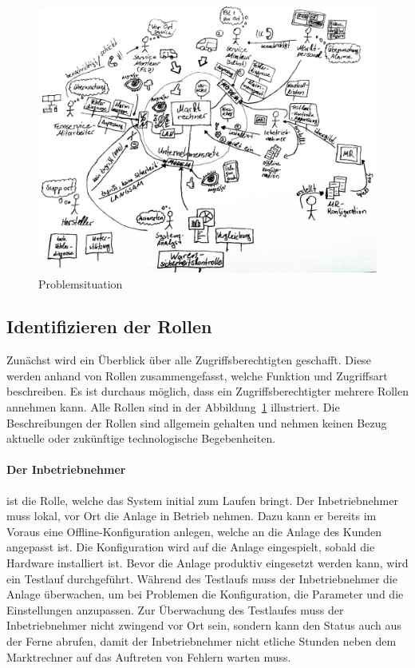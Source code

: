 \documentclass[11pt,a4paper]{report}
\begin{document}
\begin{figure}[h]
\centering
\includegraphics[scale=0.237]{images/problemsituation.jpg}
\caption{Problemsituation}
\label{fig:current_setup}
\end{figure}

\subsection{Identifizieren der Rollen} \label{sec:roles}

Zunächst wird ein Überblick über alle Zugriffsberechtigten geschafft. Diese werden anhand von Rollen zusammengefasst, welche Funktion und Zugriffsart beschreiben. Es ist durchaus möglich, dass ein Zugriffsberechtigter mehrere Rollen annehmen kann. Alle Rollen sind in der Abbildung~\ref{fig:current_setup} illustriert. Die Beschreibungen der Rollen sind allgemein gehalten und nehmen keinen Bezug aktuelle oder zukünftige technologische Begebenheiten.

\paragraph{Der Inbetriebnehmer} ist die Rolle, welche das System initial zum Laufen bringt. Der Inbetriebnehmer muss lokal, vor Ort die Anlage in Betrieb nehmen. Dazu kann er bereits im Voraus eine Offline-Konfiguration anlegen, welche an die Anlage des Kunden angepasst ist. Die Konfiguration wird auf die Anlage eingespielt, sobald die Hardware installiert ist. Bevor die Anlage produktiv eingesetzt werden kann, wird ein Testlauf durchgeführt. Während des Testlaufs muss der Inbetriebnehmer die Anlage überwachen, um bei Problemen die Konfiguration, die Parameter und die Einstellungen anzupassen. Zur Überwachung des Testlaufes muss der Inbetriebnehmer nicht zwingend vor Ort sein, sondern kann den Status auch aus der Ferne abrufen, damit der Inbetriebnehmer nicht etliche Stunden neben dem Marktrechner auf das Auftreten von Fehlern warten muss.
\end{document}
